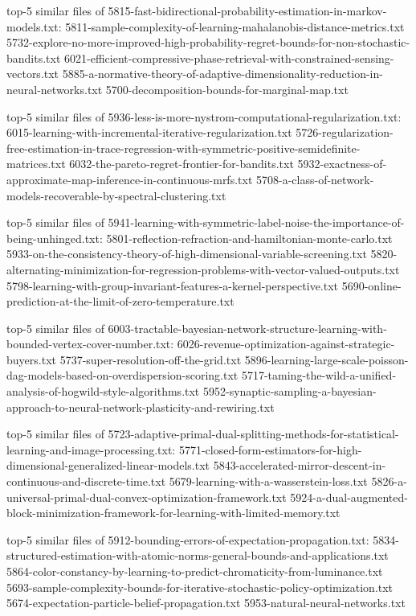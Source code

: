 \documentclass[11pt]{article}
\begin{document}
top-5 similar files of
5815-fast-bidirectional-probability-estimation-in-markov-models.txt:
5811-sample-complexity-of-learning-mahalanobis-distance-metrics.txt
5732-explore-no-more-improved-high-probability-regret-bounds-for-non-stochastic-bandits.txt
6021-efficient-compressive-phase-retrieval-with-constrained-sensing-vectors.txt
5885-a-normative-theory-of-adaptive-dimensionality-reduction-in-neural-networks.txt
5700-decomposition-bounds-for-marginal-map.txt

top-5 similar files of
5936-less-is-more-nystrom-computational-regularization.txt:
6015-learning-with-incremental-iterative-regularization.txt
5726-regularization-free-estimation-in-trace-regression-with-symmetric-positive-semidefinite-matrices.txt
6032-the-pareto-regret-frontier-for-bandits.txt
5932-exactness-of-approximate-map-inference-in-continuous-mrfs.txt
5708-a-class-of-network-models-recoverable-by-spectral-clustering.txt

top-5 similar files of
5941-learning-with-symmetric-label-noise-the-importance-of-being-unhinged.txt:
5801-reflection-refraction-and-hamiltonian-monte-carlo.txt
5933-on-the-consistency-theory-of-high-dimensional-variable-screening.txt
5820-alternating-minimization-for-regression-problems-with-vector-valued-outputs.txt
5798-learning-with-group-invariant-features-a-kernel-perspective.txt
5690-online-prediction-at-the-limit-of-zero-temperature.txt

top-5 similar files of
6003-tractable-bayesian-network-structure-learning-with-bounded-vertex-cover-number.txt:
6026-revenue-optimization-against-strategic-buyers.txt
5737-super-resolution-off-the-grid.txt
5896-learning-large-scale-poisson-dag-models-based-on-overdispersion-scoring.txt
5717-taming-the-wild-a-unified-analysis-of-hogwild-style-algorithms.txt
5952-synaptic-sampling-a-bayesian-approach-to-neural-network-plasticity-and-rewiring.txt

top-5 similar files of
5723-adaptive-primal-dual-splitting-methods-for-statistical-learning-and-image-processing.txt:
5771-closed-form-estimators-for-high-dimensional-generalized-linear-models.txt
5843-accelerated-mirror-descent-in-continuous-and-discrete-time.txt
5679-learning-with-a-wasserstein-loss.txt
5826-a-universal-primal-dual-convex-optimization-framework.txt
5924-a-dual-augmented-block-minimization-framework-for-learning-with-limited-memory.txt

top-5 similar files of
5912-bounding-errors-of-expectation-propagation.txt:
5834-structured-estimation-with-atomic-norms-general-bounds-and-applications.txt
5864-color-constancy-by-learning-to-predict-chromaticity-from-luminance.txt
5693-sample-complexity-bounds-for-iterative-stochastic-policy-optimization.txt
5674-expectation-particle-belief-propagation.txt
5953-natural-neural-networks.txt
\end{document}
